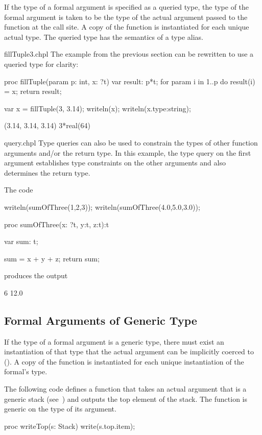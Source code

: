 If the type of a formal argument is specified as a queried type, the
type of the formal argument is taken to be the type of the actual
argument passed to the function at the call site.  A copy of the
function is instantiated for each unique actual type.  The queried
type has the semantics of a type alias.
\begin{chapelexample}{fillTuple3.chpl}
The example from the previous section can be rewritten to use a
queried type for clarity:
\begin{chapel}
proc fillTuple(param p: int, x: ?t) {
  var result: p*t;
  for param i in 1..p do
    result(i) = x;
  return result;
}
\end{chapel}
\begin{chapelpost}
var x = fillTuple(3, 3.14);
writeln(x);
writeln(x.type:string);
\end{chapelpost}
\begin{chapeloutput}
(3.14, 3.14, 3.14)
3*real(64)
\end{chapeloutput}
\end{chapelexample}

\begin{chapelexample}{query.chpl}
Type queries can also be used to constrain the types of other function arguments
and/or the return type.  In this example, the type query on the first argument
establishes type constraints on the other arguments and also determines the
return type.

The code
\begin{chapel}
writeln(sumOfThree(1,2,3));
writeln(sumOfThree(4.0,5.0,3.0));

proc sumOfThree(x: ?t, y:t, z:t):t {
   var sum: t;

   sum = x + y + z;
   return sum;
}
\end{chapel}
produces the output
\begin{chapelprintoutput}{}
6
12.0
\end{chapelprintoutput}
\end{chapelexample}

\subsection{Formal Arguments of Generic Type}
\label{Formal_Arguments_of_Generic_Type}

If the type of a formal argument is a generic type, there must exist
an instantiation of that type that the actual argument can be implicitly
coerced to ().
A copy of the function is instantiated for each unique instantiation of
the formal's type.
\begin{example}
The following code defines a function  that takes an
actual argument that is a generic stack
(see~) and outputs the top element of the
stack.  The function is generic on the type of its argument.
\begin{chapel}
proc writeTop(s: Stack) {
  write(s.top.item);
}
\end{chapel}
\end{example}

